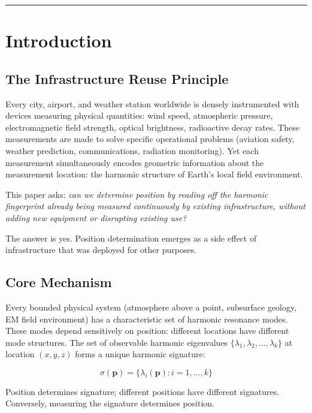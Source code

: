 \documentclass[11pt,twocolumn,a4paper]{article}
\theoremstyle{definition}
\begin{document}
\tableofcontents
\vspace{12pt}\hrule\vspace{12pt}

\section{Introduction}
\label{sec:introduction}

\subsection{The Infrastructure Reuse Principle}

Every city, airport, and weather station worldwide is densely instrumented with devices measuring physical quantities: wind speed, atmospheric pressure, electromagnetic field strength, optical brightness, radioactive decay rates. These measurements are made to solve specific operational problems (aviation safety, weather prediction, communications, radiation monitoring). Yet each measurement simultaneously encodes geometric information about the measurement location: the harmonic structure of Earth's local field environment.

This paper asks: \emph{can we determine position by reading off the harmonic fingerprint already being measured continuously by existing infrastructure, without adding new equipment or disrupting existing use?}

The answer is yes. Position determination emerges as a side effect of infrastructure that was deployed for other purposes.

\subsection{Core Mechanism}

Every bounded physical system (atmosphere above a point, subsurface geology, EM field environment) has a characteristic set of harmonic resonance modes. These modes depend sensitively on position: different locations have different mode structures. The set of observable harmonic eigenvalues $\{\lambda_1, \lambda_2, \ldots, \lambda_k\}$ at location $(x,y,z)$ forms a unique harmonic signature:

\[
\sigma(\mathbf{p}) = \{\lambda_i(\mathbf{p}) : i = 1, \ldots, k\}
\]

Position determines signature; different positions have different signatures. Conversely, measuring the signature determines position.
\end{document}
